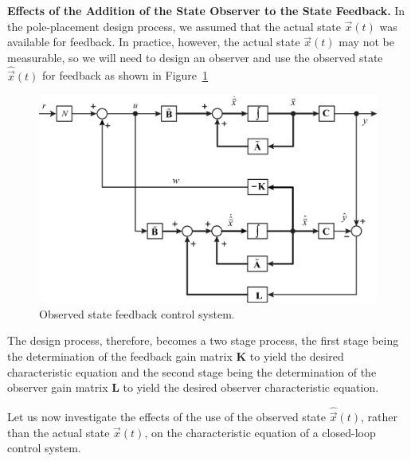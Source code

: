 \documentclass[11pt,a4paper,oneside]{book}
\numberwithin{equation}{section}
\theoremstyle{it}
\theoremstyle{definition}
\begin{document}
\vspace{5mm}
\textbf{Effects of the Addition of the State Observer to the State Feedback.} 
In the pole-placement design process, we assumed that the actual state $\vec 
x(t)$ was available for feedback. In practice, however, the actual state $\vec 
x(t)$ may not be measurable, so we will need to design an observer and use the 
observed state $\hat{\vec x}(t)$ for feedback as shown in 
Figure~\ref{figure_state_observer_comp}
\begin{figure}
	\centering
	\includegraphics[width = 380pt, keepaspectratio]{figures/state_observer_compensator_1.eps}
		\captionsetup{width=0.5\textwidth, font=small}		
		\caption{Observed state feedback control system.}
	\label{figure_state_observer_comp}
\end{figure}
The design process, therefore, becomes a two stage process, the first stage being the determination of the feedback gain matrix $\mathbf{K}$ to yield the desired characteristic equation and the second stage being the determination of the observer gain matrix $\mathbf{L}$ to yield the desired observer characteristic equation.

Let us now investigate the effects of the use of the observed state $\hat{\vec x}(t)$, rather than the actual state $\vec x(t)$, on the characteristic equation of a closed-loop control system.
\end{document}
